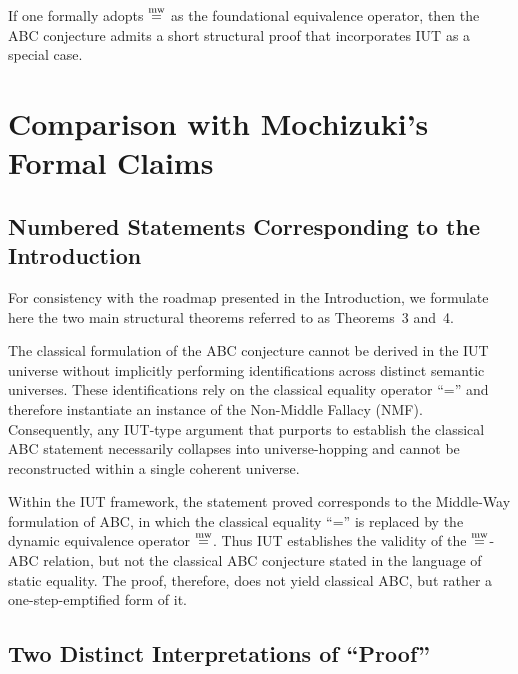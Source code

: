 \documentclass[11pt]{article}
\begin{document}
\begin{corollary}
If one formally adopts $\mathrel{\overset{\mathrm{mw}}{=}}$ as the foundational equivalence
operator, then the ABC conjecture admits a short structural proof that
incorporates IUT as a special case.
\end{corollary}


\section{Comparison with Mochizuki's Formal Claims}


\subsection{Numbered Statements Corresponding to the Introduction}

For consistency with the roadmap presented in the Introduction, we
formulate here the two main structural theorems referred to as
Theorems~3 and~4.

\begin{theorem}\label{thm:NMF-IUT}
The classical formulation of the ABC conjecture cannot be derived in
the IUT universe without implicitly performing identifications across
distinct semantic universes.  These identifications rely on the
classical equality operator ``='' and therefore instantiate an
instance of the Non-Middle Fallacy (NMF).  Consequently, any IUT-type
argument that purports to establish the classical ABC statement
necessarily collapses into universe-hopping and cannot be reconstructed
within a single coherent universe.
\end{theorem}

\begin{theorem}\label{thm:IUT-mweq}
Within the IUT framework, the statement proved corresponds to the
Middle-Way formulation of ABC, in which the classical equality ``='' is
replaced by the dynamic equivalence operator $\mathrel{\overset{\mathrm{mw}}{=}}$.  
Thus IUT establishes the validity of the $\mathrel{\overset{\mathrm{mw}}{=}}$-ABC relation, but not
the classical ABC conjecture stated in the language of static equality.
The proof, therefore, does not yield classical ABC, but rather a
one-step-emptified form of it.
\end{theorem}


\subsection{Two Distinct Interpretations of ``Proof''}
\end{document}
